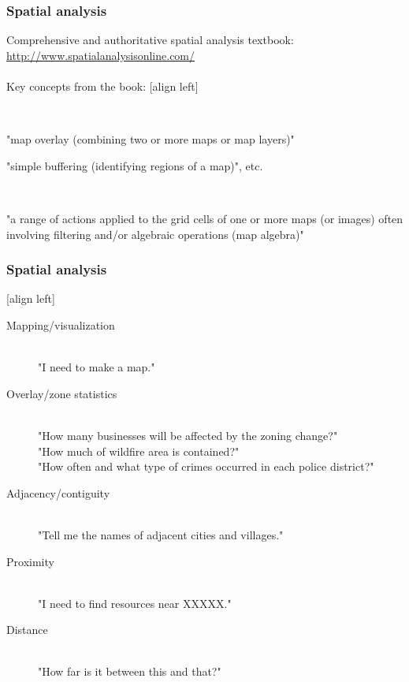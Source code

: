 \documentclass[11pt]{beamer}
\begin{document}
\begin{frame}
\frametitle{Spatial analysis}
Comprehensive and authoritative spatial analysis textbook:
\href{http://www.spatialanalysisonline.com/}{http://www.spatialanalysisonline.com/}
\\~\\
Key concepts from the book:
[align left]
\begin{description}
\item[Vector-base] \hfill \\ 
  \item "map overlay (combining two or more maps or map layers)" \\
  \item "simple buffering (identifying regions of a map)", etc.
\item[Raster-base] \hfill \\ 
  \item "a range of actions applied to the grid cells of one or more maps (or images) often involving filtering and/or algebraic operations (map algebra)"
\end{description}
\end{frame}

\begin{frame}
\frametitle{Spatial analysis}
[align left]
\begin{description}
  \item[Mapping/visualization] \hfill \\"I need to make a map."
  \item[Overlay/zone statistics] \hfill \\"How many businesses will be affected by the zoning change?"  \hfill \\ "How much of wildfire area is contained?" \hfill \\"How often and what type of crimes occurred in each police district?"
  \item[Adjacency/contiguity] \hfill \\"Tell me the names of adjacent cities and villages."
  \item[Proximity] \hfill \\"I need to find resources near XXXXX."
  \item[Distance] \hfill \\"How far is it between this and that?"
\end{description}
\end{frame}
\end{document}
